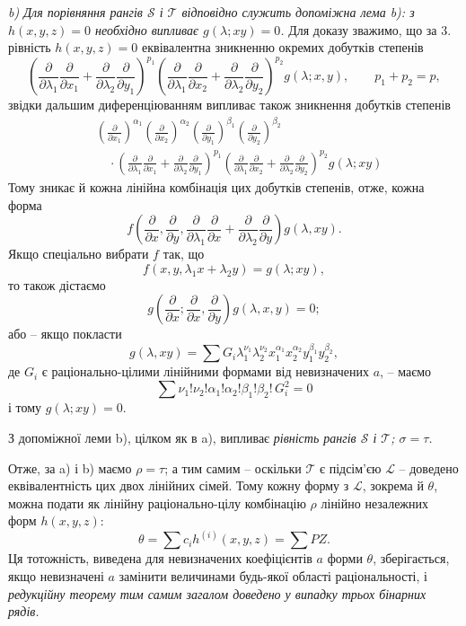 \documentclass[11pt]{article}
\begin{document}
\emph{b) Для порівняння рангів $\mathcal S$ і $\mathcal T$ відповідно служить допоміжна лема b): з $h(x,y,z)=0$ необхідно випливає $g(\lambda;xy)=0$.} Для доказу зважимо, що за 3. рівність $h(x,y,z)=0$ еквівалентна зникненню окремих добутків степенів
\[
 \left(\frac{\partial}{\partial\lambda_1}\frac{\partial}{\partial x_1}
 +\frac{\partial}{\partial\lambda_2}\frac{\partial}{\partial y_1}\right)^{p_1}
 \left(\frac{\partial}{\partial\lambda_1}\frac{\partial}{\partial x_2}
 +\frac{\partial}{\partial\lambda_2}\frac{\partial}{\partial y_2}\right)^{p_2}g(\lambda;x,y),
 \qquad p_1+p_2=p,
\]
звідки дальшим диференціюванням випливає також зникнення добутків степенів
\[
\begin{aligned}
&\left(\frac{\partial}{\partial x_1}\right)^{\alpha_1}
 \left(\frac{\partial}{\partial x_2}\right)^{\alpha_2}
 \left(\frac{\partial}{\partial y_1}\right)^{\beta_1}
 \left(\frac{\partial}{\partial y_2}\right)^{\beta_2} \\
&\quad\cdot
 \left(\frac{\partial}{\partial\lambda_1}\frac{\partial}{\partial x_1}
 +\frac{\partial}{\partial\lambda_2}\frac{\partial}{\partial y_1}\right)^{p_1}
 \left(\frac{\partial}{\partial\lambda_1}\frac{\partial}{\partial x_2}
 +\frac{\partial}{\partial\lambda_2}\frac{\partial}{\partial y_2}\right)^{p_2}
 g(\lambda;xy)
\end{aligned}
\]
Тому зникає й кожна лінійна комбінація цих добутків степенів, отже, кожна форма
\[
  f\left(\frac{\partial}{\partial x},\frac{\partial}{\partial y},
  \frac{\partial}{\partial\lambda_1}\frac{\partial}{\partial x}
  +\frac{\partial}{\partial\lambda_2}\frac{\partial}{\partial y}\right)g(\lambda,xy).
\]
Якщо спеціально вибрати $f$ так, що
\[
  f(x,y,\lambda_1x+\lambda_2y)=g(\lambda;xy),
\]
то також дістаємо
\[
  g\left(\frac{\partial}{\partial x};
    \frac{\partial}{\partial x},
    \frac{\partial}{\partial y}\right)g(\lambda,x,y)=0;
\]
або -- якщо покласти
\[
  g(\lambda,xy)=\sum G_i\lambda_1^{\nu_1}\lambda_2^{\nu_2}
  x_1^{\alpha_1}x_2^{\alpha_2}y_1^{\beta_1}y_2^{\beta_2},
\]
де $G_i$ є раціонально-цілими лінійними формами від невизначених $a$, -- маємо
\[
  \sum \nu_1!\nu_2!\alpha_1!\alpha_2!\beta_1!\beta_2!\,G_i^2=0
\]
і тому $g(\lambda;xy)=0$.

З допоміжної леми b), цілком як в a), випливає \emph{рівність рангів $\mathcal S$ і $\mathcal T$; $\sigma=\tau$.}

Отже, за a) і b) маємо $\rho=\tau$; а тим самим -- оскільки $\mathcal T$ є підсім'єю $\mathcal L$ -- доведено еквівалентність цих двох лінійних сімей. Тому кожну форму з $\mathcal L$, зокрема й $\theta$, можна подати як лінійну раціонально-цілу комбінацію $\rho$ лінійно незалежних форм $h(x,y,z)$:
\[
  \theta=\sum c_i h^{(i)}(x,y,z)=\sum PZ.
\]
Ця тотожність, виведена для невизначених коефіцієнтів $a$ форми $\theta$, зберігається, якщо невизначені $a$ замінити величинами будь-якої області раціональності, і \emph{редукційну теорему тим самим загалом доведено у випадку трьох бінарних рядів.}
\end{document}
